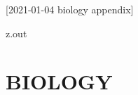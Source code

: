 [2021-01-04 biology appendix]

\begin{VerbatimOut}{z.out}
\chapter{BIOLOGY}
\end{VerbatimOut}

\MyIO
